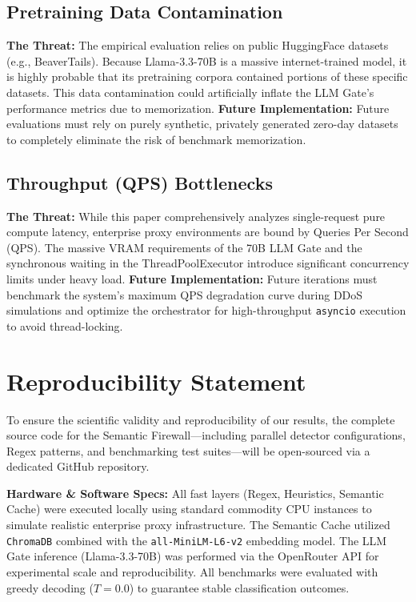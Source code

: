 \documentclass[12pt,a4paper]{article}
\begin{document}
\subsection{Pretraining Data Contamination}
\textbf{The Threat:} The empirical evaluation relies on public HuggingFace datasets (e.g., BeaverTails). Because Llama-3.3-70B is a massive internet-trained model, it is highly probable that its pretraining corpora contained portions of these specific datasets. This data contamination could artificially inflate the LLM Gate's performance metrics due to memorization.
\textbf{Future Implementation:} Future evaluations must rely on purely synthetic, privately generated zero-day datasets to completely eliminate the risk of benchmark memorization.

\subsection{Throughput (QPS) Bottlenecks}
\textbf{The Threat:} While this paper comprehensively analyzes single-request pure compute latency, enterprise proxy environments are bound by Queries Per Second (QPS). The massive VRAM requirements of the 70B LLM Gate and the synchronous waiting in the ThreadPoolExecutor introduce significant concurrency limits under heavy load.
\textbf{Future Implementation:} Future iterations must benchmark the system's maximum QPS degradation curve during DDoS simulations and optimize the orchestrator for high-throughput \texttt{asyncio} execution to avoid thread-locking.

\section{Reproducibility Statement}

To ensure the scientific validity and reproducibility of our results, the complete source code for the Semantic Firewall---including parallel detector configurations, Regex patterns, and benchmarking test suites---will be open-sourced via a dedicated GitHub repository. 

\textbf{Hardware \& Software Specs:}
All fast layers (Regex, Heuristics, Semantic Cache) were executed locally using standard commodity CPU instances to simulate realistic enterprise proxy infrastructure. The Semantic Cache utilized \texttt{ChromaDB} combined with the \texttt{all-MiniLM-L6-v2} embedding model. The LLM Gate inference (Llama-3.3-70B) was performed via the OpenRouter API for experimental scale and reproducibility. All benchmarks were evaluated with greedy decoding ($T{=}0.0$) to guarantee stable classification outcomes.
\end{document}
